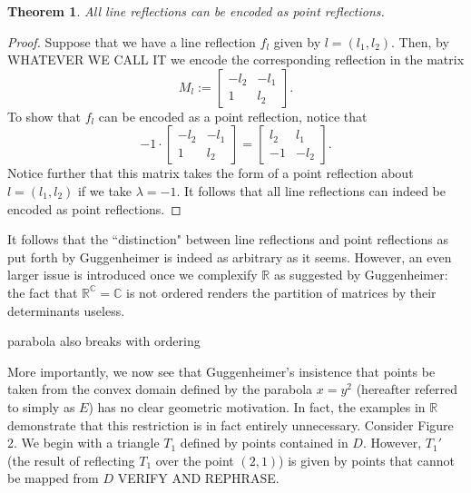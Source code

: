 \documentclass[12pt]{article}
\newcommand{\R}{\mathbb{R}}
\newcommand{\C}{\mathbb{C}}
\newcommand{\lftmat}[4]{\begin{bmatrix} {#1} & {#2} \\ {#3} & {#4} \end{bmatrix}}
\newcommand{\linenoendmat}[2]{\begin{bmatrix} -{#2} & -{#1} \\ 1 & {#2} \end{bmatrix}}
\newcommand{\stanlinenoendmat}{\linenoendmat{l_1}{l_2}}
\theoremstyle{plain}
\newtheorem{theorem}{Theorem}[section]
\theoremstyle{definition}
\begin{document}
\begin{theorem}
All line reflections can be encoded as point reflections. 
\end{theorem}

\begin{proof}
Suppose that we have a line reflection $f_l$ given by $l = (l_1, l_2)$. Then, by WHATEVER WE CALL IT we encode the corresponding reflection in the matrix 
\[ M_l := \stanlinenoendmat. \]
To show that $f_l$ can be encoded as a point reflection, notice that 
\[ -1 \cdot \stanlinenoendmat = \lftmat{l_2}{l_1}{-1}{-l_2}.\]
Notice further that this matrix takes the form of a point reflection about $l = (l_1, l_2)$ if we take $\lambda = -1$. It follows that all line reflections can indeed be encoded as point reflections.
\end{proof}

It follows that the ``distinction" between line reflections and point reflections as put forth by Guggenheimer is indeed as arbitrary as it seems. However, an even larger issue is introduced once we complexify $\R$ as suggested by Guggenheimer: the fact that $\R^{\C} = \C$ is not ordered renders the partition of matrices by their determinants useless. 

parabola also breaks with ordering

More importantly, we now see that Guggenheimer's insistence that points be taken from the convex domain defined by the parabola $x = y^2$ (hereafter referred to simply as $E$) has no clear geometric motivation. In fact, the examples in $\R$ demonstrate that this restriction is in fact entirely unnecessary. Consider Figure 2. We begin with a triangle $T_1$ defined by points contained in $D$. However, $T_1'$ (the result of reflecting $T_1$ over the point $(2, 1)$) is given by points that cannot be mapped from $D$ VERIFY AND REPHRASE. 
\end{document}
